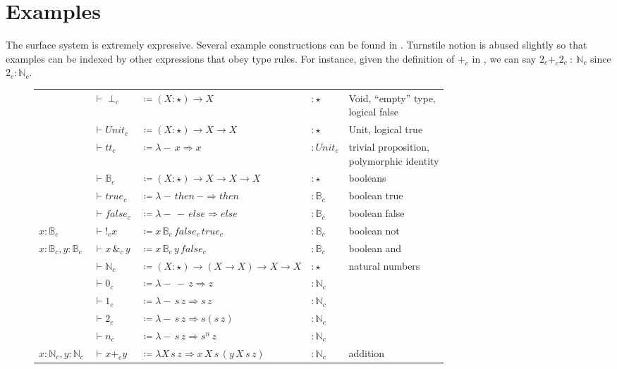 \section{Examples}

The surface system is extremely expressive.
Several example \slang{} constructions can be found in .
Turnstile notion is abused slightly so that examples can be indexed by other expressions that obey type rules.
For instance, given the definition of $+_{c}$ in , we can say $2_{c}+_{c}2_{c}\ :\ \mathbb{N}_{c}$ since $2_{c}:\mathbb{N}_{c}$.

\begin{sidewaysfigure}
\begin{tabular}{lllll}
  & $\vdash\perp_{c}$ & $\coloneqq\left(X:\star\right)\rightarrow X$ & $:\star$ & \makecell[l]{Void, ``empty'' type,\\ logical false}\tabularnewline
  & $\vdash Unit_{c}$ & $\coloneqq\left(X:\star\right)\rightarrow X\rightarrow X$ & $:\star$ & Unit, logical true\tabularnewline
  & $\vdash tt_{c}$ & $\coloneqq\lambda-\,x\Rightarrow x$ & $:Unit_{c}$ & \makecell[l]{trivial proposition,\\ polymorphic identity}\tabularnewline
  & $\vdash\mathbb{B}_{c}$ & $\coloneqq\left(X:\star\right)\rightarrow X\rightarrow X\rightarrow X$ & $:\star$ & booleans\tabularnewline
  & $\vdash true_{c}$ & $\coloneqq\lambda-\,then\,-\Rightarrow then$ & $:\mathbb{B}_{c}$ & boolean true\tabularnewline
  & $\vdash false_{c}$ & $\coloneqq\lambda-\,-\,else\Rightarrow else$ & $:\mathbb{B}_{c}$ & boolean false\tabularnewline
$x:\mathbb{B}_{c}$ & $\vdash!_{c}x$ & $\coloneqq x\,\mathbb{B}_{c}\,false_{c}\,true_{c}$ & $:\mathbb{B}_{c}$ & boolean not\tabularnewline
$x:\mathbb{B}_{c},y:\mathbb{B}_{c}$ & $\vdash x\,\&_{c}\,y$ & $\coloneqq x\,\mathbb{B}_{c}\,y\,false_{c}$ & $:\mathbb{B}_{c}$ & boolean and\tabularnewline
  & $\vdash\mathbb{N}_{c}$ & $\coloneqq\left(X:\star\right)\rightarrow(X\rightarrow X)\rightarrow X\rightarrow X$ & $:\star$ & natural numbers\tabularnewline
  & $\vdash0_{c}$ & $\coloneqq\lambda-\,-\,z\Rightarrow z$ & $:\mathbb{N}_{c}$ & \tabularnewline
  & $\vdash1_{c}$ & $\coloneqq\lambda-\,s\,z\Rightarrow s\,z$ & $:\mathbb{N}_{c}$ & \tabularnewline
  & $\vdash2_{c}$ & $\coloneqq\lambda-\,s\,z\Rightarrow s\left(s\,z\right)$ & $:\mathbb{N}_{c}$ & \tabularnewline
  & $\vdash n_{c}$ & $\coloneqq\lambda-\,s\,z\Rightarrow s^{n}\,z$ & $:\mathbb{N}_{c}$ & \tabularnewline
$x:\mathbb{N}_{c},y:\mathbb{N}_{c}$ & $\vdash x+_{c}y$ & $\coloneqq\lambda X\,s\,z\Rightarrow x\,X\,s\,\left(y\,X\,s\,z\right)$ & $:\mathbb{N}_{c}$ & addition\tabularnewline

\end{tabular}
\end{sidewaysfigure}
